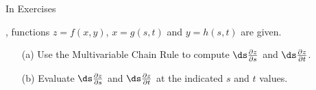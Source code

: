 {\noindent In Exercises} 
{,  functions $z=f(x,y)$, $x=g(s,t)$ and $y=h(s,t)$ are given. 
\begin{enumerate}
	\item [(a)] Use the Multivariable Chain Rule to compute $\ds \frac{\partial z}{\partial s}$ and $\ds \frac{\partial z}{\partial t}$.
	\item [(b)] Evaluate $\ds \frac{\partial z}{\partial s}$ and $\ds \frac{\partial z}{\partial t}$ at the indicated $s$ and $t$ values.
\end{enumerate}
}
